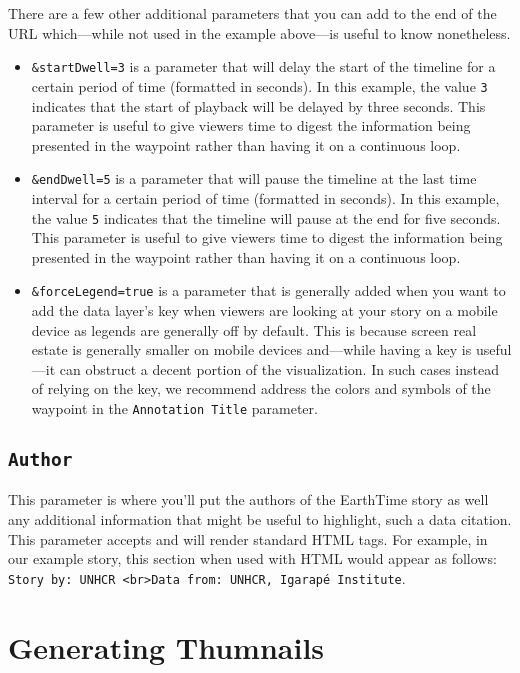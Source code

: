 \documentclass[
]{book}
\begin{document}
There are a few other additional parameters that you can add to the end of the URL which---while not used in the example above---is useful to know nonetheless.

\begin{itemize}
\item
  \texttt{\&startDwell=3} is a parameter that will delay the start of the timeline for a certain period of time (formatted in seconds). In this example, the value \texttt{3} indicates that the start of playback will be delayed by three seconds. This parameter is useful to give viewers time to digest the information being presented in the waypoint rather than having it on a continuous loop.
\item
  \texttt{\&endDwell=5} is a parameter that will pause the timeline at the last time interval for a certain period of time (formatted in seconds). In this example, the value \texttt{5} indicates that the timeline will pause at the end for five seconds. This parameter is useful to give viewers time to digest the information being presented in the waypoint rather than having it on a continuous loop.
\item
  \texttt{\&forceLegend=true} is a parameter that is generally added when you want to add the data layer's key when viewers are looking at your story on a mobile device as legends are generally off by default. This is because screen real estate is generally smaller on mobile devices and---while having a key is useful---it can obstruct a decent portion of the visualization. In such cases instead of relying on the key, we recommend address the colors and symbols of the waypoint in the \texttt{Annotation\ Title} parameter.
\end{itemize}

\hypertarget{author}{%
\subsection*{\texorpdfstring{\texttt{Author}}{Author}}\label{author}}


This parameter is where you'll put the authors of the EarthTime story as well any additional information that might be useful to highlight, such a data citation. This parameter accepts and will render standard HTML tags. For example, in our example story, this section when used with HTML would appear as follows: \texttt{Story\ by:\ UNHCR\ \textless{}br\textgreater{}Data\ from:\ UNHCR,\ Igarapé\ Institute}.

\hypertarget{generating-thumnails}{%
\section{Generating Thumnails}\label{generating-thumnails}}
\end{document}
